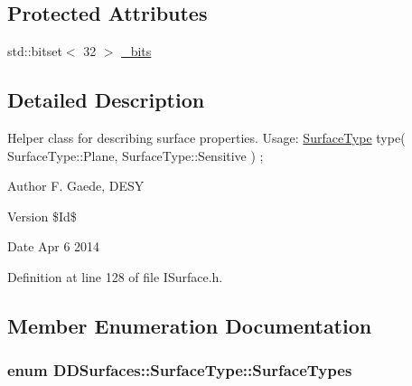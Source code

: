 \subsection*{Protected Attributes}
\begin{DoxyCompactItemize}
\item 
std::bitset$<$ 32 $>$ \hyperlink{class_d_d_surfaces_1_1_surface_type_ac6414dd53b60dfcc487030c3ba1a3220}{\_\-bits}
\end{DoxyCompactItemize}


\subsection{Detailed Description}
Helper class for describing surface properties. Usage: \hyperlink{class_d_d_surfaces_1_1_surface_type}{SurfaceType} type(  SurfaceType::Plane, SurfaceType::Sensitive ) ;

\begin{DoxyAuthor}{Author}
F. Gaede, DESY 
\end{DoxyAuthor}
\begin{DoxyVersion}{Version}
\$Id\$ 
\end{DoxyVersion}
\begin{DoxyDate}{Date}
Apr 6 2014 
\end{DoxyDate}


Definition at line 128 of file ISurface.h.

\subsection{Member Enumeration Documentation}
\hypertarget{class_d_d_surfaces_1_1_surface_type_a2e946294c5368a34e227be2b17e73051}{
\subsubsection[{SurfaceTypes}]{\setlength{\rightskip}{0pt plus 5cm}enum {\bf DDSurfaces::SurfaceType::SurfaceTypes}}}
\label{class_d_d_surfaces_1_1_surface_type_a2e946294c5368a34e227be2b17e73051}


